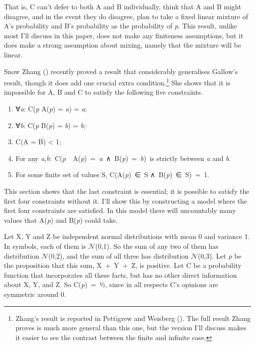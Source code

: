 \documentclass[
  11pt,
  letterpaper,
  DIV=11,
  numbers=noendperiod,
  twoside]{scrartcl}
\providecommand{\tightlist}{%
  \setlength{\itemsep}{0pt}\setlength{\parskip}{0pt}}
\begin{document}
That is, C can't defer to both A and B individually, think that A and B
might disagree, and in the event they do disagree, plan to take a fixed
linear mixture of A's probability and B's probability as the probability
of \emph{p}. This result, unlike most I'll discuss in this paper, does
not make any finiteness assumptions, but it does make a strong
assumption about mixing, namely that the mixture will be linear.

Snow Zhang () recently proved a
result that considerably generalises Gallow's result, though it does add
one crucial extra condition.\footnote{Zhang's result is reported in
  Pettigrew and Weisberg ().
  The full result Zhang proves is much more general than this one, but
  the version I'll discuss makes it easier to see the contrast between
  the finite and infinite case.} She shows that it is impossible for A,
B and C to satisfy the following five constraints.

\begin{enumerate}
\def\labelenumi{\arabic{enumi}.}
\tightlist
\item
  ∀\emph{a}: C(\emph{p} \textbar{} A(\emph{p}) = \emph{a}) = \emph{a};
\item
  ∀\emph{b}: C(\emph{p} \textbar{} B(\emph{p}) = \emph{b}) = \emph{b};
\item
  C(A = B) \textless{} 1;
\item
  For any
  \emph{a},\emph{b}:~C(\emph{p}~\textbar~A(\emph{p})~=~\emph{a}~∧~B(\emph{p})~=~\emph{b})~is
  strictly between \emph{a} and \emph{b}.
\item
  For some finite set of values S, C(A(\emph{p})~∈~S
  ∧~B(\emph{p})~∈~S)~=~1.
\end{enumerate}

This section shows that the last constraint is essential; it is possible
to satisfy the first four constraints without it. I'll show this by
constructing a model where the first four constraints are satisfied. In
this model there will uncountably many values that A(\emph{p}) and
B(\emph{p}) could take.

Let X, Y and Z be independent normal distributions with mean 0 and
variance 1. In symbols, each of them is \(\mathcal{N}\)(0,1). So the sum
of any two of them has distribution \(\mathcal{N}\)(0,2), and the sum of
all three has distribution \(\mathcal{N}\)(0,3). Let \emph{p} be the
proposition that this sum, X~+~Y~+~Z, is positive. Let C be a
probability function that incorporates all these facts, but has no other
direct information about X, Y, and Z. So C(\emph{p})~=~½, since in all
respects C's opinions are symmetric around 0.
\end{document}
